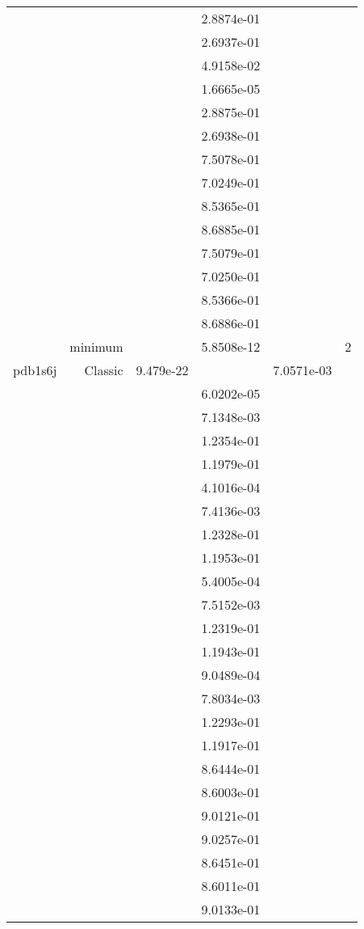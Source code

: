 \begin{xltabular}{\textwidth}{r|rS[table-format=1.3e+2]S[table-format=1.4e+2]S[table-format=1.4e+2]S[table-format=-1.5]}
&  &  & 2.8874e-01 & & \\
&  &  & 2.6937e-01 & & \\
&  &  & 4.9158e-02 & & \\
&  &  & 1.6665e-05 & & \\
&  &  & 2.8875e-01 & & \\
&  &  & 2.6938e-01 & & \\
&  &  & 7.5078e-01 & & \\
&  &  & 7.0249e-01 & & \\
&  &  & 8.5365e-01 & & \\
&  &  & 8.6885e-01 & & \\
&  &  & 7.5079e-01 & & \\
&  &  & 7.0250e-01 & & \\
&  &  & 8.5366e-01 & & \\
&  &  & 8.6886e-01 & & \\
& minimum &  & 5.8508e-12 & & 2 \\  \addlinespace
pdb1s6j & Classic & 9.479e-22 &  & 7.0571e-03 & \\
&  &  & 6.0202e-05 & & \\
&  &  & 7.1348e-03 & & \\
&  &  & 1.2354e-01 & & \\
&  &  & 1.1979e-01 & & \\
&  &  & 4.1016e-04 & & \\
&  &  & 7.4136e-03 & & \\
&  &  & 1.2328e-01 & & \\
&  &  & 1.1953e-01 & & \\
&  &  & 5.4005e-04 & & \\
&  &  & 7.5152e-03 & & \\
&  &  & 1.2319e-01 & & \\
&  &  & 1.1943e-01 & & \\
&  &  & 9.0489e-04 & & \\
&  &  & 7.8034e-03 & & \\
&  &  & 1.2293e-01 & & \\
&  &  & 1.1917e-01 & & \\
&  &  & 8.6444e-01 & & \\
&  &  & 8.6003e-01 & & \\
&  &  & 9.0121e-01 & & \\
&  &  & 9.0257e-01 & & \\
&  &  & 8.6451e-01 & & \\
&  &  & 8.6011e-01 & & \\
&  &  & 9.0133e-01 & & \\

\end{xltabular}
